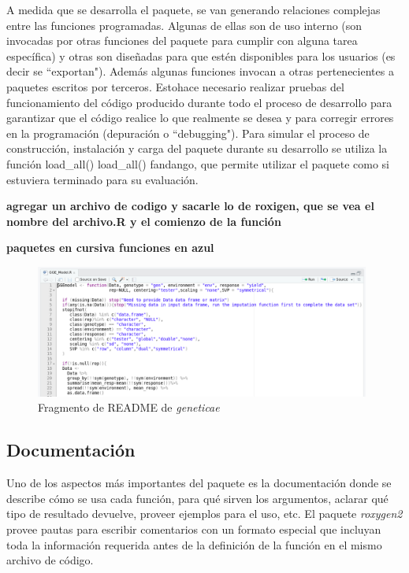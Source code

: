 A medida que se desarrolla el paquete, se van generando relaciones complejas entre las funciones programadas. Algunas de ellas son de uso interno (son invocadas por otras funciones del paquete para cumplir con alguna tarea específica) y otras son diseñadas para que estén disponibles para los usuarios (es decir se ``exportan"). Además algunas funciones invocan a otras pertenecientes a paquetes escritos por terceros. Estohace necesario realizar pruebas del funcionamiento del código  producido durante todo el proceso de desarrollo para garantizar que el código realice lo que realmente se desea y para corregir errores en la programación (depuración o ``debugging"). Para simular el proceso de construcción, instalación y carga del paquete durante su desarrollo se utiliza la función \textcolor{darkraspberry}{load\_all}()
\textcolor{fandango}{load\_all}()
fandango, que permite utilizar el paquete como si estuviera terminado para su evaluación.

\textbf{agregar un archivo de codigo y sacarle lo de roxigen, que se vea el nombre del archivo.R y el comienzo de la función}

\textbf{paquetes en cursiva funciones en azul}


\begin{figure}[H]
	\begin{center}
		\includegraphics[width=11cm]{./Graficos/GGEMODELFUNCTION.png}	
	\end{center}
	\caption{Fragmento de README de \emph{geneticae}}
	\label{fig:fig36}
\end{figure}



\subsection{Documentación}

Uno de los aspectos más importantes del paquete es la documentación donde se describe cómo se usa cada función, para qué sirven los argumentos, aclarar qué tipo de resultado devuelve, proveer ejemplos para el uso, etc. El paquete \emph{roxygen2} provee pautas para escribir comentarios con un formato especial que incluyan toda la información requerida antes de la definición de la función en el mismo archivo de código. 

